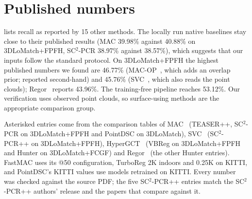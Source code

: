 \section{Published numbers}
\label{S-sec:s-literature}
 lists recall as reported by 15 other methods. The locally run native baselines stay close to their published results (MAC 39.98\% against 40.88\% on 3DLoMatch+FPFH, SC$^2$-PCR 38.97\% against 38.57\%), which suggests that our inputs follow the standard protocol. On 3DLoMatch+FPFH the highest published numbers we found are 46.77\% (MAC-OP~\cite{yang2024mac}, which adds an overlap prior; reported second-hand) and 45.76\% (SVC~\cite{zhang2024svc}, which also reads the point clouds); Regor~\cite{zhao2025regor} reports 43.96\%. The training-free pipeline reaches 53.12\%. Our verification uses observed point clouds, so surface-using methods are the appropriate comparison group.

Asterisked entries come from the comparison tables of MAC~\cite{zhang2023mac} (TEASER++, SC$^2$-PCR on 3DLoMatch+FPFH and PointDSC on 3DLoMatch), SVC~\cite{zhang2024svc} (SC$^2$-PCR++ on 3DLoMatch+FPFH), HyperGCT~\cite{zhang2025hypergct} (VBReg on 3DLoMatch+FPFH and Hunter on 3DLoMatch+FCGF) and Regor~\cite{zhao2025regor} (the other Hunter entries). FastMAC uses its @50 configuration, TurboReg 2K indoors and 0.25K on KITTI, and PointDSC's KITTI values use models retrained on KITTI. Every number was checked against the source PDF; the five SC$^2$-PCR++ entries match the SC$^2$-PCR++ authors' release and the papers that compare against it.
